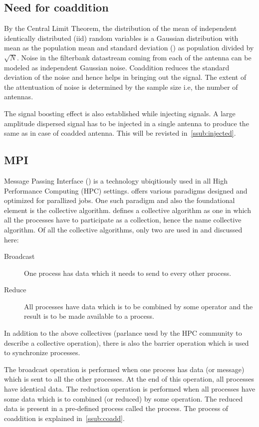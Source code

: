\subsection {Need for coaddition}
\label{ssub:needcoaddition}
\par By the Central Limit Theorem, the distribution of the mean of independent identically distributed (iid) random variables is a Gaussian distribution with mean as the population mean and standard deviation (\sd) as population \sd divided by $\sqrt{N}$.
Noise in the filterbank datastream coming from each of the antenna can be modeled as independent Gaussian noise.
Coaddition reduces the standard deviation of the noise and hence helps in bringing out the signal.
The extent of the attentuation of noise is determined by the sample size i.e, the number of antennas.

\par The signal boosting effect is also established while injecting signals. 
A large amplitude dispersed signal has to be injected in a single antenna to produce the same \sn as in case of coadded antenna.
This will be revisted in~\autoref{ssub:injected}.

\subsection {MPI}
\label{ssub:mpic}
\par Message Passing Interface (\mpi) is a technology ubiqitiously used in all High Performance Computing (HPC) settings. 
\mpi offers various paradigms designed and optimized for parallized jobs. One such paradigm and also the foundational element is the collective algorithm. 
\mpi defines a collective algorithm as one in which all the processes have to participate as a collection, hence the name collective algorithm. Of all the collective algorithms, only two are used in \vf and discussed here:
\begin{description}
	\item[Broadcast] One process has data which it needs to send to every other process.
	\item[Reduce] All processes have data which is to be combined by some operator and the result is to be made available to a process.
\end{description}
In addition to the above collectives (parlance uesd by the HPC community to describe a collective operation), there is also the barrier operation which is used to synchronize processes. 

\par The broadcast operation is performed when one process has data (or message) which is sent to all the other processes. At the end of this operation, all processes have identical data. The reduction operation is performed when all processes have some data which is to combined (or reduced) by some operation. The reduced data is present in a pre-defined process called the \root process. 
The process of coaddition is explained in~\autoref{ssub:coadd}. 

